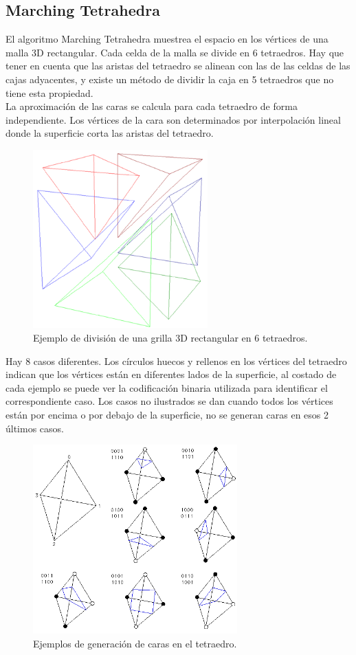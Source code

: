\documentclass[12pt]{article}
\begin{document}
\subsection{Marching Tetrahedra}
El algoritmo Marching Tetrahedra\cite{marching}\cite{marchingt} muestrea el espacio en los vértices de una malla 3D rectangular. Cada celda de la malla se divide en 6 tetraedros. Hay que tener en cuenta que las aristas del tetraedro se alinean con las de las celdas de las cajas adyacentes, y existe un método de dividir la caja en 5 tetraedros que no tiene esta propiedad.
\\La aproximación de las caras se calcula para cada tetraedro de forma independiente. Los vértices de la cara son determinados por interpolación lineal donde la superficie corta las aristas del tetraedro.
\begin{figure}[h!]
\includegraphics[width=0.6\textwidth,center]{mt1.png}
\caption{Ejemplo de división de una grilla 3D rectangular en 6 tetraedros.}
\end{figure}
\clearpage
Hay 8 casos diferentes. Los círculos huecos y rellenos en los vértices del tetraedro indican que los vértices están en diferentes lados de la superficie, al costado de cada ejemplo se puede ver la codificación binaria utilizada para identificar el correspondiente caso. Los casos no ilustrados se dan cuando todos los vértices están por encima o por debajo de la superficie, no se generan caras en esos 2 últimos casos.\\
\begin{figure}[h!]
\includegraphics[width=0.7\textwidth,center]{mt2.png}
\caption{Ejemplos de generación de caras en el tetraedro.}
\end{figure}\\
\end{document}
